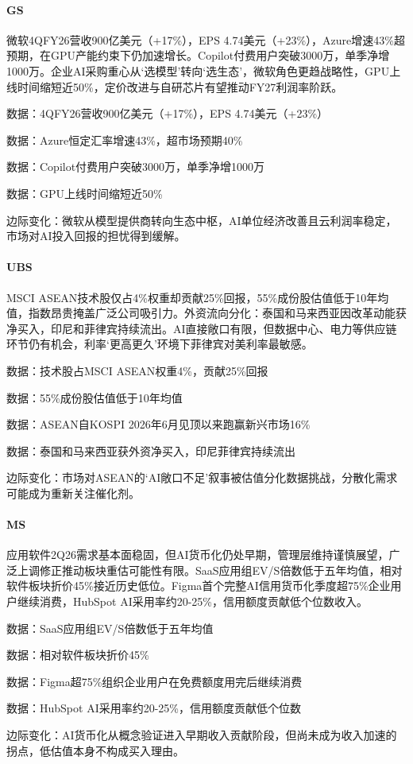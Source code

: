 \documentclass[11pt]{ctexart}
\begin{document}
\paragraph{GS} 微软4QFY26营收900亿美元（+17\%），EPS 4.74美元（+23\%），Azure增速43\%超预期，在GPU产能约束下仍加速增长。Copilot付费用户突破3000万，单季净增1000万。企业AI采购重心从‘选模型’转向‘选生态’，微软角色更趋战略性，GPU上线时间缩短近50\%，定价改进与自研芯片有望推动FY27利润率阶跃。
{\small\color{refgray}数据：4QFY26营收900亿美元（+17\%），EPS 4.74美元（+23\%）\par}
{\small\color{refgray}数据：Azure恒定汇率增速43\%，超市场预期40\%\par}
{\small\color{refgray}数据：Copilot付费用户突破3000万，单季净增1000万\par}
{\small\color{refgray}数据：GPU上线时间缩短近50\%\par}
{\small\color{refgray}边际变化：微软从模型提供商转向生态中枢，AI单位经济改善且云利润率稳定，市场对AI投入回报的担忧得到缓解。\par}
\paragraph{UBS} MSCI ASEAN技术股仅占4\%权重却贡献25\%回报，55\%成份股估值低于10年均值，指数昂贵掩盖广泛公司吸引力。外资流向分化：泰国和马来西亚因改革动能获净买入，印尼和菲律宾持续流出。AI直接敞口有限，但数据中心、电力等供应链环节仍有机会，利率‘更高更久’环境下菲律宾对美利率最敏感。
{\small\color{refgray}数据：技术股占MSCI ASEAN权重4\%，贡献25\%回报\par}
{\small\color{refgray}数据：55\%成份股估值低于10年均值\par}
{\small\color{refgray}数据：ASEAN自KOSPI 2026年6月见顶以来跑赢新兴市场16\%\par}
{\small\color{refgray}数据：泰国和马来西亚获外资净买入，印尼菲律宾持续流出\par}
{\small\color{refgray}边际变化：市场对ASEAN的‘AI敞口不足’叙事被估值分化数据挑战，分散化需求可能成为重新关注催化剂。\par}
\paragraph{MS} 应用软件2Q26需求基本面稳固，但AI货币化仍处早期，管理层维持谨慎展望，广泛上调修正推动板块重估可能性有限。SaaS应用组EV/S倍数低于五年均值，相对软件板块折价45\%接近历史低位。Figma首个完整AI信用货币化季度超75\%企业用户继续消费，HubSpot AI采用率约20-25\%，信用额度贡献低个位数收入。
{\small\color{refgray}数据：SaaS应用组EV/S倍数低于五年均值\par}
{\small\color{refgray}数据：相对软件板块折价45\%\par}
{\small\color{refgray}数据：Figma超75\%组织企业用户在免费额度用完后继续消费\par}
{\small\color{refgray}数据：HubSpot AI采用率约20-25\%，信用额度贡献低个位数\par}
{\small\color{refgray}边际变化：AI货币化从概念验证进入早期收入贡献阶段，但尚未成为收入加速的拐点，低估值本身不构成买入理由。\par}
\end{document}
